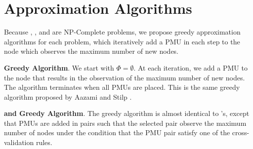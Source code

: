 \section{Approximation Algorithms}
\label{sec:approx}

Because \maxincs, \xvals, and \xvalpart are NP-Complete problems, we propose greedy approximation algorithms for each problem, which iteratively add 
a PMU in each step to the node which observes the maximum number of new nodes. 

{\bf \maxinc Greedy Algorithm}. We start with $\Phi = \emptyset$.  At each iteration, we add a PMU to the node that results in the observation of the maximum number of 
new nodes. The algorithm terminates when all PMUs are placed.  This is the same greedy algorithm proposed by Aazami and Stilp \cite{Aazami07}. 

{\bf \xval and \xvalpart Greedy Algorithm}. The greedy algorithm is almost identical to \maxincs's, except that PMUs are added in pairs such that the selected pair observe
the maximum number of nodes under the condition that the PMU pair satisfy one of the cross-validation rules. %




%
%

